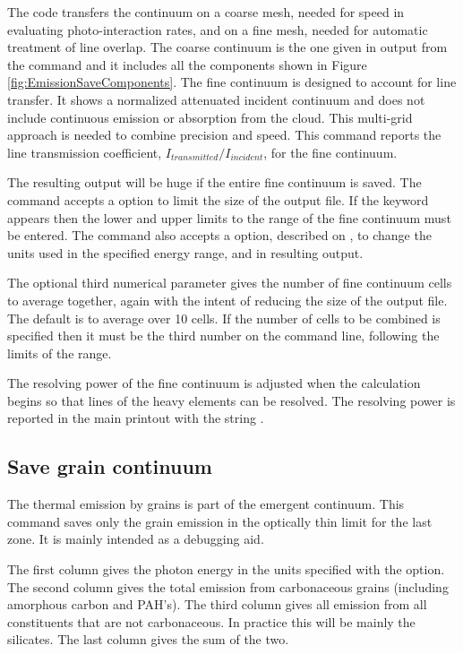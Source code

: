 The code transfers the continuum on a coarse mesh, needed for speed in
evaluating photo-interaction rates, and on a fine mesh, needed for automatic
treatment of line overlap.
The coarse continuum is the one given in output
from the  command and it includes all the components shown in Figure \ref{fig:EmissionSaveComponents}.
The fine continuum is designed to account for line transfer.
It shows a normalized attenuated incident continuum and 
does not include continuous
emission or absorption from the cloud.  
This multi-grid approach is needed to combine
precision and speed.  This command reports the line transmission coefficient,
$I_{transmitted}/I_{incident}$, for the fine continuum.

The resulting output will be huge if the entire fine continuum is saved.
The command accepts a  option to limit the size of the output file.
If the keyword  appears then
the lower and upper limits to the range
of the fine continuum must be entered.
The command also accepts
a  option,
described on \pageref{output_units}, to change the units used
in the specified energy range, and in resulting output.

The optional third numerical parameter gives the number
of fine continuum cells to average together, again with the intent of
reducing the size of the output file.  The default is to average over 10
cells.  If the number of cells to be combined is specified then it must
be the third number on the command line, following the limits
of the range.

The resolving power of the fine continuum is adjusted when the calculation begins so
that lines of the heavy elements can be resolved.
The resolving power is reported in the main printout with the string
.

\subsection{Save grain continuum}

The thermal emission by grains is part of the emergent continuum.  This
command saves only the grain emission in the optically thin limit for
the last zone.  It is mainly intended as a debugging aid.

The first column gives the photon energy in the units specified with
the  option.  The second column gives the total emission from
carbonaceous grains (including amorphous carbon and PAH's).  The third column
gives all emission from all constituents that are not carbonaceous.  In
practice this will be mainly the silicates.  The last column gives the sum
of the two.

